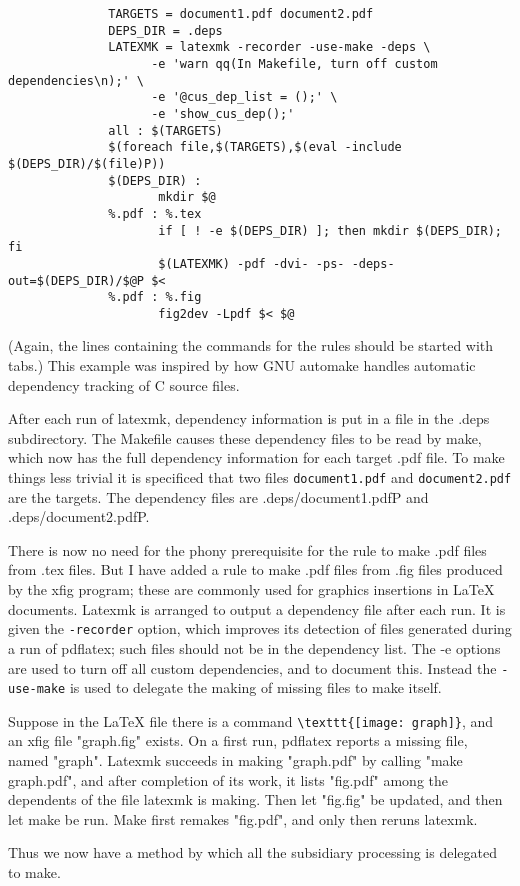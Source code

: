 \begin{verbatim}
              TARGETS = document1.pdf document2.pdf
              DEPS_DIR = .deps
              LATEXMK = latexmk -recorder -use-make -deps \
                    -e 'warn qq(In Makefile, turn off custom dependencies\n);' \
                    -e '@cus_dep_list = ();' \
                    -e 'show_cus_dep();'
              all : $(TARGETS)
              $(foreach file,$(TARGETS),$(eval -include $(DEPS_DIR)/$(file)P))
              $(DEPS_DIR) :
                     mkdir $@
              %.pdf : %.tex
                     if [ ! -e $(DEPS_DIR) ]; then mkdir $(DEPS_DIR); fi
                     $(LATEXMK) -pdf -dvi- -ps- -deps-out=$(DEPS_DIR)/$@P $<
              %.pdf : %.fig
                     fig2dev -Lpdf $< $@
\end{verbatim}

(Again,  the  lines  containing  the  commands  for the rules should be started
with tabs.)  This example was inspired by how GNU automake handles automatic
dependency tracking of C source files.

After  each  run of latexmk, dependency information is put in a file in
the .deps subdirectory.  The Makefile causes these dependency files  to
be read by make, which now has the full dependency information for each target
.pdf file.  To make things less trivial it  is  specificed  that two  files
\verb|document1.pdf| and \verb|document2.pdf| are the targets.  The dependency files are
.deps/document1.pdfP and .deps/document2.pdfP.

There is now no need for the phony prerequisite for the  rule  to  make .pdf
files from .tex files.  But I have added a rule to make .pdf files from .fig
files produced by the xfig program; these are  commonly  used for  graphics
insertions  in  LaTeX documents.  Latexmk is arranged to output a dependency
file after each run.  It is given the \verb|-recorder| option,  which  improves its
detection of files generated during a run of pdflatex; such files should not be
in the dependency list.  The -e  options  are  used  to  turn off all custom
dependencies, and to document this.  Instead the \verb|-use-make| is used to delegate
the making of  missing files to make itself.

Suppose  in  the LaTeX file there is a command \verb|\texttt{[image: graph]}|, and an
xfig file "graph.fig" exists.  On a first run, pdflatex  reports a  missing
file, named "graph". Latexmk succeeds in making "graph.pdf" by calling "make
graph.pdf", and after completion of its work, it lists "fig.pdf" among the
dependents of the file latexmk is making.  Then let "fig.fig" be updated, and
then let make be  run.   Make  first  remakes "fig.pdf", and only then reruns
latexmk.

Thus  we  now  have  a method by which all the subsidiary processing is
delegated to make.



